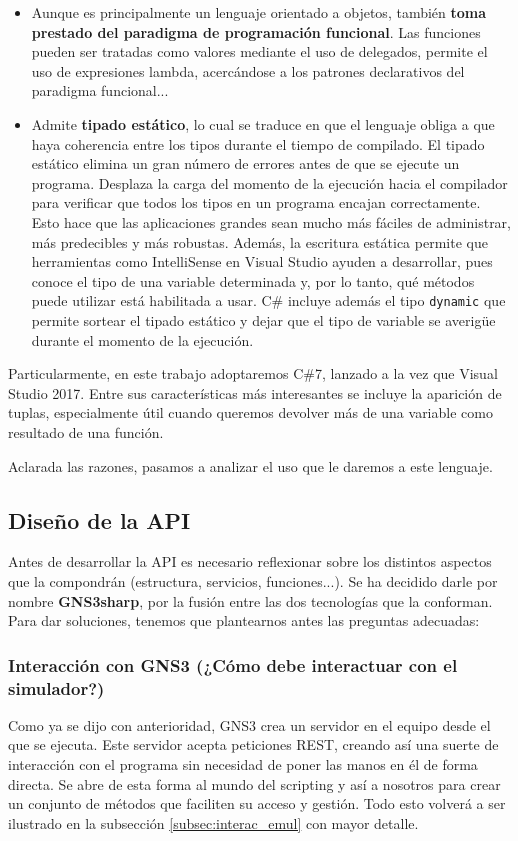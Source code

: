 \begin{itemize}
\begin{itemize}
\item Aunque es principalmente un lenguaje orientado a objetos, también \textbf{toma prestado del paradigma de programación funcional}. Las funciones pueden ser tratadas como valores mediante el uso de delegados, permite el uso de expresiones lambda, acercándose a los patrones declarativos del paradigma funcional...
\item Admite \textbf{tipado estático}, lo cual se traduce en que el lenguaje obliga a que haya coherencia entre los tipos durante el tiempo de compilado. El tipado estático elimina un gran número de errores antes de que se ejecute un programa. Desplaza la carga del momento de la ejecución hacia el compilador para verificar que todos los tipos en un programa encajan correctamente. Esto hace que las aplicaciones grandes sean mucho más fáciles de administrar, más predecibles y más robustas. Además, la escritura estática permite que herramientas como IntelliSense en Visual Studio ayuden a desarrollar, pues conoce el tipo de una variable determinada y, por lo tanto, qué métodos puede utilizar está habilitada a usar. C\# incluye además el tipo \texttt{dynamic} que permite sortear el tipado estático y dejar que el tipo de variable se averigüe durante el momento de la ejecución\cite{csnutshell}.
\end{itemize}
Particularmente, en este trabajo adoptaremos C\#7, lanzado a la vez que Visual Studio 2017. Entre sus características más interesantes se incluye la aparición de tuplas, especialmente útil cuando queremos devolver más de una variable como resultado de una función.
\end{itemize}
Aclarada las razones, pasamos a analizar el uso que le daremos a este lenguaje.

\subsection{Diseño de la API}
Antes de desarrollar la API es necesario reflexionar sobre los distintos aspectos que la compondrán (estructura, servicios, funciones...). Se ha decidido darle por nombre \textbf{GNS3sharp}, por la fusión entre las dos tecnologías que la conforman. Para dar soluciones, tenemos que plantearnos antes las preguntas adecuadas:
\subsubsection[Interacción con GNS3]{Interacción con GNS3 (¿Cómo debe interactuar con el simulador?)}
Como ya se dijo con anterioridad, GNS3 crea un servidor en el equipo desde el que se ejecuta. Este servidor acepta peticiones REST, creando así una suerte de interacción con el programa sin necesidad de poner las manos en él de forma directa. Se abre de esta forma al mundo del scripting y así a nosotros para crear un conjunto de métodos que faciliten su acceso y gestión. Todo esto volverá a ser ilustrado en la subsección \ref{subsec:interac_emul} con mayor detalle.

